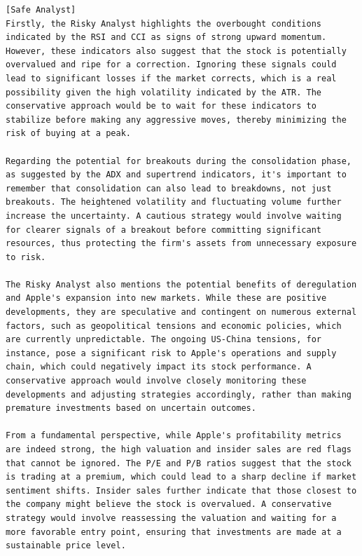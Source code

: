\begin{tcolorbox}[
    breakable,
    enhanced,
    colback=lightorange!60!white,
    colframe=orange!30!gray,
    coltitle=black,
    boxrule=0.5pt,
    arc=0.5mm,
    top=2mm, bottom=2mm, left=2mm, right=2mm,
    fonttitle=\usefont{T1}{ppl}{b}{n},
    title=\model: Risk Management Team Conservative Agent -- Apple (AAPL),
]
\footnotesize
\begin{lstlisting}[style=agentbase]
[Safe Analyst]
Firstly, the Risky Analyst highlights the overbought conditions indicated by the RSI and CCI as signs of strong upward momentum. However, these indicators also suggest that the stock is potentially overvalued and ripe for a correction. Ignoring these signals could lead to significant losses if the market corrects, which is a real possibility given the high volatility indicated by the ATR. The conservative approach would be to wait for these indicators to stabilize before making any aggressive moves, thereby minimizing the risk of buying at a peak.

Regarding the potential for breakouts during the consolidation phase, as suggested by the ADX and supertrend indicators, it's important to remember that consolidation can also lead to breakdowns, not just breakouts. The heightened volatility and fluctuating volume further increase the uncertainty. A cautious strategy would involve waiting for clearer signals of a breakout before committing significant resources, thus protecting the firm's assets from unnecessary exposure to risk.

The Risky Analyst also mentions the potential benefits of deregulation and Apple's expansion into new markets. While these are positive developments, they are speculative and contingent on numerous external factors, such as geopolitical tensions and economic policies, which are currently unpredictable. The ongoing US-China tensions, for instance, pose a significant risk to Apple's operations and supply chain, which could negatively impact its stock performance. A conservative approach would involve closely monitoring these developments and adjusting strategies accordingly, rather than making premature investments based on uncertain outcomes.

From a fundamental perspective, while Apple's profitability metrics are indeed strong, the high valuation and insider sales are red flags that cannot be ignored. The P/E and P/B ratios suggest that the stock is trading at a premium, which could lead to a sharp decline if market sentiment shifts. Insider sales further indicate that those closest to the company might believe the stock is overvalued. A conservative strategy would involve reassessing the valuation and waiting for a more favorable entry point, ensuring that investments are made at a sustainable price level.


\end{lstlisting}
\end{tcolorbox}
